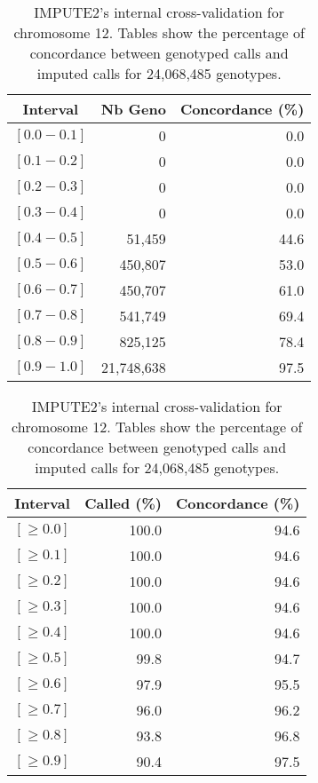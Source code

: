 \documentclass[10pt,twoside,english]{scrartcl}
\begin{document}
\begin{table}[H]
\protect\caption{IMPUTE2's internal cross-validation for chromosome 12. Tables show the
percentage of concordance between genotyped calls and imputed calls
for 24,068,485 genotypes.\label{tab:cross_validation_chr_12}}

\centering

\begin{tabular}{crr}
\hline 
\multicolumn{1}{c}{\textbf{Interval}}
 & \multicolumn{1}{c}{\textbf{Nb Geno}}
 & \multicolumn{1}{c}{\textbf{Concordance (\%)}}
\\
\hline 

$[0.0-0.1]$ & 0 & 0.0\\
$[0.1-0.2]$ & 0 & 0.0\\
$[0.2-0.3]$ & 0 & 0.0\\
$[0.3-0.4]$ & 0 & 0.0\\
$[0.4-0.5]$ & 51,459 & 44.6\\
$[0.5-0.6]$ & 450,807 & 53.0\\
$[0.6-0.7]$ & 450,707 & 61.0\\
$[0.7-0.8]$ & 541,749 & 69.4\\
$[0.8-0.9]$ & 825,125 & 78.4\\
$[0.9-1.0]$ & 21,748,638 & 97.5\\
\hline 
\end{tabular}
\hfill
\begin{tabular}{crr}
\hline 
\multicolumn{1}{c}{\textbf{Interval}}
 & \multicolumn{1}{c}{\textbf{Called (\%)}}
 & \multicolumn{1}{c}{\textbf{Concordance (\%)}}
\\
\hline 

$[\geq 0.0]$ & 100.0 & 94.6\\
$[\geq 0.1]$ & 100.0 & 94.6\\
$[\geq 0.2]$ & 100.0 & 94.6\\
$[\geq 0.3]$ & 100.0 & 94.6\\
$[\geq 0.4]$ & 100.0 & 94.6\\
$[\geq 0.5]$ & 99.8 & 94.7\\
$[\geq 0.6]$ & 97.9 & 95.5\\
$[\geq 0.7]$ & 96.0 & 96.2\\
$[\geq 0.8]$ & 93.8 & 96.8\\
$[\geq 0.9]$ & 90.4 & 97.5\\
\hline 
\end{tabular}


\end{table}
\end{document}
